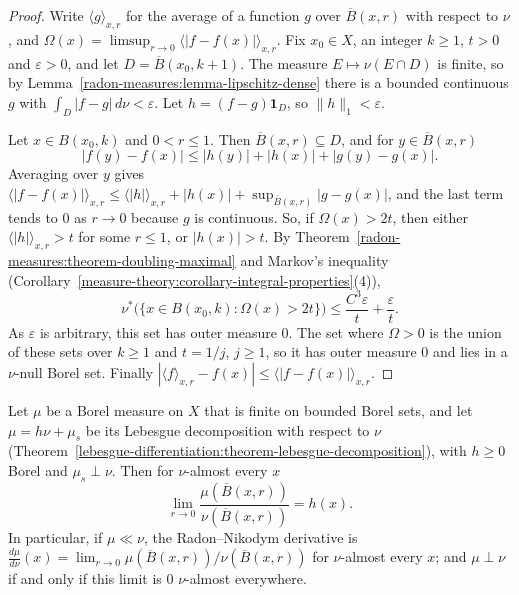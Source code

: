 \begin{proof}
Write $\langle g \rangle_{x, r}$ for the average of a function $g$ over $\overline{B}(x, r)$ with respect to $\nu$, and $\Omega(x) = \limsup_{r \to 0}\langle|f - f(x)|\rangle_{x, r}$. Fix $x_0 \in X$, an integer $k \geq 1$,
$t > 0$ and $\varepsilon > 0$, and let $D = \overline{B}(x_0, k + 1)$. The measure $E \mapsto \nu(E \cap D)$ is finite, so by Lemma~\ref{radon-measures:lemma-lipschitz-dense} there is a bounded continuous $g$ with
$\int_D|f - g|\,d\nu < \varepsilon$. Let $h = (f - g)\mathbf{1}_D$, so $\|h\|_1 < \varepsilon$.

Let $x \in B(x_0, k)$ and $0 < r \leq 1$. Then $\overline{B}(x, r) \subseteq D$, and for $y \in \overline{B}(x, r)$
\[
|f(y) - f(x)| \leq |h(y)| + |h(x)| + |g(y) - g(x)| .
\]
Averaging over $y$ gives $\langle|f - f(x)|\rangle_{x, r} \leq \langle|h|\rangle_{x, r} + |h(x)| + \sup_{\overline{B}(x, r)}|g - g(x)|$, and the last term tends to $0$ as $r \to 0$ because $g$ is continuous. So, if
$\Omega(x) > 2t$, then either $\langle|h|\rangle_{x, r} > t$ for some $r \leq 1$, or $|h(x)| > t$. By Theorem~\ref{radon-measures:theorem-doubling-maximal} and Markov's inequality
(Corollary~\ref{measure-theory:corollary-integral-properties}(4)),
\[
\nu^*\bigl(\{x \in B(x_0, k) : \Omega(x) > 2t\}\bigr) \leq \frac{C^3\varepsilon}{t} + \frac{\varepsilon}{t} .
\]
As $\varepsilon$ is arbitrary, this set has outer measure $0$. The set where $\Omega > 0$ is the union of these sets over $k \geq 1$ and $t = 1/j$, $j \geq 1$, so it has outer measure $0$ and lies in a
$\nu$-null Borel set. Finally $|\langle f \rangle_{x, r} - f(x)| \leq \langle|f - f(x)|\rangle_{x, r}$.
\end{proof}

\begin{theorem}\label{radon-measures:theorem-doubling-differentiation}
Let $\mu$ be a Borel measure on $X$ that is finite on bounded Borel sets, and let $\mu = h\nu + \mu_s$ be its Lebesgue decomposition with respect to $\nu$
(Theorem~\ref{lebesgue-differentiation:theorem-lebesgue-decomposition}), with $h \geq 0$ Borel and $\mu_s \perp \nu$. Then for $\nu$-almost every $x$
\[
\lim_{r \to 0}\frac{\mu(\overline{B}(x, r))}{\nu(\overline{B}(x, r))} = h(x) .
\]
In particular, if $\mu \ll \nu$, the Radon--Nikodym derivative is $\frac{d\mu}{d\nu}(x) = \lim_{r \to 0}\mu(\overline{B}(x, r))/\nu(\overline{B}(x, r))$ for $\nu$-almost every $x$; and $\mu \perp \nu$ if and only
if this limit is $0$ $\nu$-almost everywhere.
\end{theorem}

